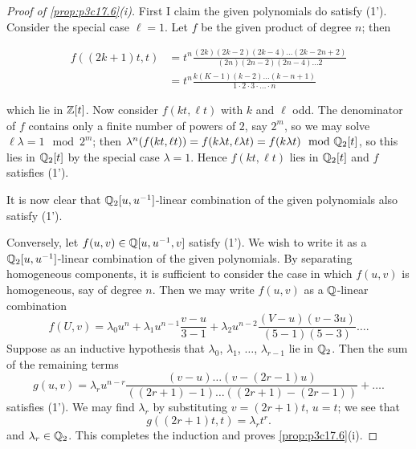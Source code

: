 \documentclass[../main]{subfiles}
\begin{document}
\begin{proof}[Proof of \ref{prop:p3c17.6}(i)]
First I claim the given polynomials do satisfy (1'). Consider the special case $\ell = 1$. Let $f$ be the given product of degree $n$; then

\begin{align*}
f((2k + 1)t, t) & = t^n \frac {(2k)(2k - 2)(2k - 4) \ldots (2k - 2n + 2)} {(2n)(2n-2)(2n-4)\ldots2} \\ & = t^n \frac {k(K - 1)(k - 2)\ldots (k - n + 1)} {1 \cdot 2 \cdot 3 \cdot \ldots \cdot n}
\end{align*}

which lie in $\mathbb{Z}[t]$. Now consider $f(kt, \ell t)$ with $k$ and $\ell$ odd. The denominator of $f$ contains only a finite number of powers of $2$, say $2^m$, so we may solve $\ell \lambda = 1 \mod 2^m$; then $\lambda^n(f(kt, \ell t)) = f(k \lambda t, \ell \lambda t) = f(k \lambda t) \mod {\mathbb{Q}}_2[t]$, so this lies in $\mathbb{Q}_2[t]$ by the special case $\lambda = 1$. Hence $f(kt, \ell t)$ lies in $\mathbb{Q}_2[t]$ and $f$ satisfies (1').

It is now clear that $\mathbb{Q}_2[u, u^{-1}]$-linear combination of the given polynomials also satisfy (1').

Conversely, let $f(u, v) \in \mathbb{Q}[u, u^{-1}, v]$ satisfy (1'). We wish to write it as a $\mathbb{Q}_2[u, u^{-1}]$-linear combination of the given polynomials. By separating homogeneous components, it is sufficient to consider the case in which $f(u, v)$ is homogeneous, say of degree $n$. Then we may write $f(u, v)$ as a $\mathbb{Q}$-linear combination $$f(U, v) = \lambda_0 u^n + \lambda_1 u^{n - 1} \frac {v - u} {3 - 1} + \lambda_2 u^{n - 2} \frac {(V - u)(v - 3u)} {(5 - 1)(5 - 3)} \ldots.$$ Suppose as an inductive hypothesis that $\lambda_0$, $\lambda_1$, $\ldots$, $\lambda_{r - 1}$ lie in $\mathbb{Q}_2$. Then the sum of the remaining terms $$g(u,v) = \lambda_r u^{n - r} \frac {(v - u) \ldots (v - (2r - 1)u)} {((2r + 1) - 1) \ldots ((2r + 1) - (2r - 1))} + \ldots.$$ satisfies (1'). We may find $\lambda_r$ by substituting $v = (2r + 1)t$, $u = t$; we see that $$g((2r + 1)t, t) = \lambda_r t^r.$$ and $\lambda_r \in \mathbb{Q}_2$. This completes the induction and proves \ref{prop:p3c17.6}(i).
\end{proof}
\end{document}
